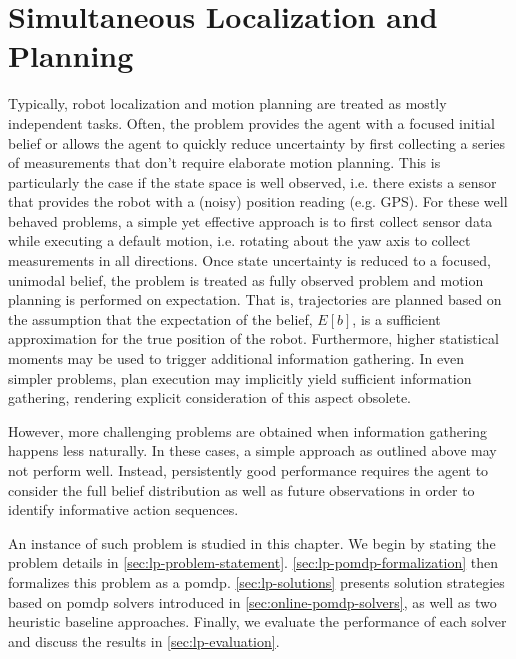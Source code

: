 \chapter{Simultaneous Localization and Planning}\label{chap:localization-and-planning}


Typically, robot localization and motion planning are treated as mostly
independent tasks. Often, the problem provides the agent with a focused initial
belief or allows the agent to quickly reduce uncertainty by first collecting
a series of measurements that don't require elaborate motion planning. This is
particularly the case if the state space is well observed, i.e. there exists
a sensor that provides the robot with a (noisy) position reading (e.g. GPS).
For these well behaved problems, a simple yet effective approach is to first
collect sensor data while executing a default motion, i.e. rotating about the
yaw axis to collect measurements in all directions. Once state uncertainty is
reduced to a focused, unimodal belief, the problem is treated as fully observed
problem and motion planning is performed on expectation. That is, trajectories
are planned based on the assumption that the expectation of the belief, $E[b]$,
is a sufficient approximation for the true position of the robot. Furthermore,
higher statistical moments  may be used
to trigger additional information gathering. In even simpler problems, plan
execution may implicitly yield sufficient information gathering, rendering
explicit consideration of this aspect obsolete.

However, more challenging problems are obtained when information gathering
happens less naturally. In these cases, a simple approach as outlined above
may not perform well. Instead, persistently good performance requires the agent
to consider the full belief distribution as well as future observations in
order to identify informative action sequences.

An instance of such problem is studied in this chapter. We begin by stating the
problem details in \cref{sec:lp-problem-statement}.
\cref{sec:lp-pomdp-formalization} then formalizes this problem as a \ac{pomdp}.
\cref{sec:lp-solutions} presents solution strategies based on \ac{pomdp}
solvers introduced in \cref{sec:online-pomdp-solvers}, as well as two heuristic
baseline approaches. Finally, we evaluate the performance of each solver and
discuss the results in \cref{sec:lp-evaluation}.

